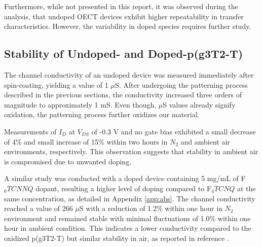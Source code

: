 Furthermore, while not presented in this report, it was observed during the analysis, that undoped OECT devices exhibit higher repeatability in transfer characteristics. %
However, the variability in doped species requires further study. %

\subsection{Stability of Undoped- and Doped-p(g3T2-T)} \label{subsec:stab}
The channel conductivity of an undoped device was measured immediately after spin-coating, yielding a value of 1 $\mu$S. After undergoing the patterning process described in the previous sections, the conductivity increased three orders of magnitude to approximately 1 mS. Even though, $\mu$S values already signify oxidation, the patterning process further oxidizes our material. %

Measurements of $I_{D}$ at $V_{DS}$ of -0.3 V and no gate bias exhibited a small decrease of 4\% and small increase of 15\% within two hours in $N_{2}$ and ambient air environments, respectively. This observation suggests that stability in ambient air is compromised due to unwanted doping.

A similar study was conducted with a doped device containing 5 mg/mL of F$_{6}TCNNQ$ dopant, resulting a higher level of doping compared to F$_{4}TCNQ$ at the same concentration, as detailed in Appendix \ref{app:abs}. The channel conductivity reached a value of 266 $\mu$S with a reduction of 1.2\% within one hour in $N_{2}$ environment and remained stable with minimal fluctuations of 1.0\% within one hour in ambient condition. This indicates a lower conductivity compared to the oxidized p(g3T2-T) but similar stability in air, as reported in reference \cite{tanTuningOrganicElectrochemical2022}.

